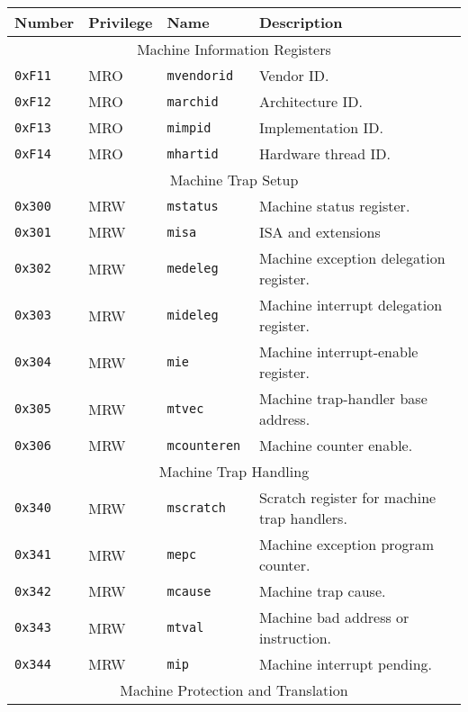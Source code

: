 \begin{table}[htb!]
\begin{center}
\begin{tabular}{|l|l|l|l|}
\hline
Number    & Privilege & Name & Description \\
\hline  
\multicolumn{4}{|c|}{Machine Information Registers} \\
\hline
\tt 0xF11 & MRO &\tt mvendorid   & Vendor ID. \\
\tt 0xF12 & MRO &\tt marchid     & Architecture ID. \\
\tt 0xF13 & MRO &\tt mimpid      & Implementation ID. \\
\tt 0xF14 & MRO &\tt mhartid     & Hardware thread ID. \\
\hline  
\multicolumn{4}{|c|}{Machine Trap Setup} \\
\hline
\tt 0x300 & MRW  &\tt mstatus    & Machine status register. \\
\tt 0x301 & MRW  &\tt misa       & ISA and extensions \\
\tt 0x302 & MRW  &\tt medeleg    & Machine exception delegation register. \\
\tt 0x303 & MRW  &\tt mideleg    & Machine interrupt delegation register. \\
\tt 0x304 & MRW  &\tt mie        & Machine interrupt-enable register. \\
\tt 0x305 & MRW  &\tt mtvec      & Machine trap-handler base address. \\
\tt 0x306 & MRW  &\tt mcounteren & Machine counter enable. \\
\hline
\multicolumn{4}{|c|}{Machine Trap Handling} \\
\hline
\tt 0x340 & MRW  &\tt mscratch   & Scratch register for machine trap handlers. \\
\tt 0x341 & MRW  &\tt mepc       & Machine exception program counter. \\
\tt 0x342 & MRW  &\tt mcause     & Machine trap cause. \\
\tt 0x343 & MRW  &\tt mtval      & Machine bad address or instruction. \\
\tt 0x344 & MRW  &\tt mip        & Machine interrupt pending. \\
\hline
\multicolumn{4}{|c|}{Machine Protection and Translation} \\
\hline

\end{tabular}
\end{center}
\end{table}
